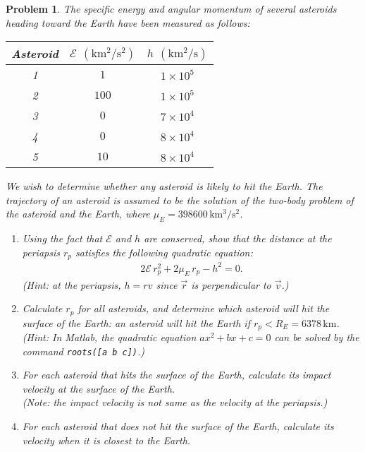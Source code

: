 \documentclass[10pt]{article}
\theoremstyle{plain}\theorembodyfont{\normalfont}
\newtheorem{prob}{Problem}[section]
\newenvironment{subprob}%
{\renewcommand{\theenumi}{\alph{enumi}}\renewcommand{\labelenumi}{(\theenumi)}\begin{enumerate}}%
{\end{enumerate}}%
\begin{document}
\clearpage\newpage
\begin{prob}
The specific energy and angular momentum of several asteroids heading toward the Earth have been measured as follows:

\begin{center}
\begin{tabular}{c|c|c}\hline
Asteroid & $\mathcal{E}$ $(\mathrm{km^2/s^2})$ & $h$ $(\mathrm{km^2/s})$\\ \hline
1 & $1$ & $1\times 10^5$\\
2 & $100$ & $1\times 10^5$\\
3 & $0$ & $7\times 10^4$\\
4 & $0$ & $8\times 10^4$\\
5 & $10$ & $8\times 10^4$\\\hline
\end{tabular}
\end{center}
%
We wish to determine whether any asteroid is likely to hit the Earth. The trajectory of an asteroid is assumed to be the solution of the two-body problem of the asteroid and the Earth, where $\mu_E=398600\,\mathrm{km^3/s^2}$.

\begin{subprob}
\item Using the fact that $\mathcal{E}$ and $h$ are conserved, show that the distance at the periapsis $r_p$ satisfies the following quadratic equation:
\begin{gather}
2\mathcal{E}\, r_p^2 + 2\mu_E\, r_p -h^2=0. 
\end{gather}
(Hint: at the periapsis, $h=rv$ since $\vec r$ is perpendicular to $\vec v$.)
\item Calculate $r_p$ for all asteroids, and determine which asteroid will hit the surface of the Earth: an asteroid will hit the Earth if $r_p < R_E=6378\,\mathrm{km}$.\\
(Hint: In Matlab, the quadratic equation $ax^2+bx+c=0$ can be solved by the command \texttt{roots([a b c])}.)
\item For each asteroid that hits the surface of the Earth, calculate its impact velocity at the surface of the Earth.\\
(Note: the impact velocity is not same as the velocity at the periapsis.)
\item For each asteroid that does not hit the surface of the Earth, calculate its velocity when it is closest to the Earth.
\end{subprob}
\end{prob}
\end{document}
